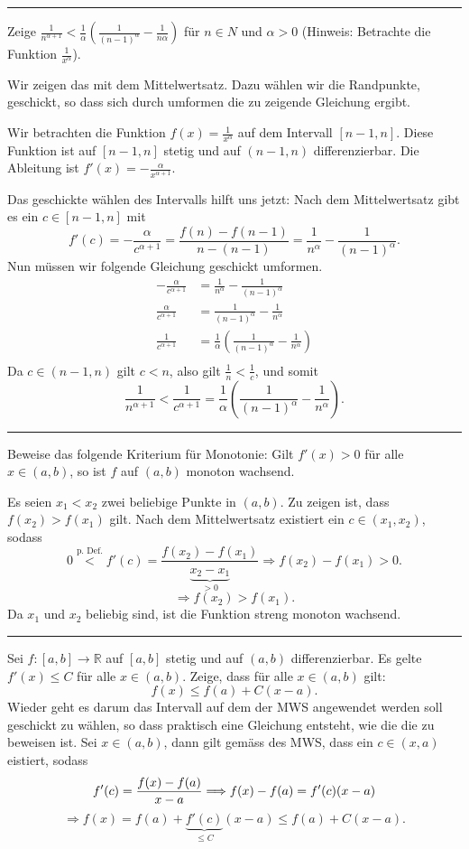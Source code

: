 \documentclass[a4paper,landscape,8pt]{extarticle}
\newcommand{\R}{\mathbb{R}}
\newcommand{\sep}{\vspace{5pt}\noindent\hrule\vspace{5pt}}
\begin{document}
\begin{multicols*}{4}
\begin{warmup}
\sep

\Bsp Zeige $\frac{1}{n^{\alpha+1}} <
\frac{1}{\alpha}\left(\frac{1}{(n-1)^\alpha} - \frac{1}{n\alpha}\right)$ für
$n\in N$ und $\alpha > 0$ (Hinweis: Betrachte die Funktion
$\frac{1}{x^\alpha}$).

Wir zeigen das mit dem Mittelwertsatz. Dazu wählen wir die Randpunkte,
geschickt, so dass sich durch umformen die zu zeigende Gleichung ergibt.

Wir betrachten die Funktion $f(x)=\frac{1}{x^\alpha}$ auf dem Intervall
$[n-1,n]$. Diese Funktion ist auf $[n-1,n]$ stetig und auf $(n-1,n)$
differenzierbar. Die Ableitung ist $f'(x)=-\frac{\alpha}{x^{\alpha +1}}$.

Das geschickte wählen des Intervalls hilft uns jetzt: Nach dem Mittelwertsatz
gibt es ein $c\in[n-1,n]$ mit
\[
f'(c) = -\frac{\alpha}{c^{\alpha +1}} = \frac{f(n)-f(n-1)}{n-(n-1)} =
\frac{1}{n^\alpha}-\frac{1}{(n-1)^\alpha}.
\]
Nun müssen wir folgende Gleichung geschickt umformen.
\begin{align*}
-\frac{\alpha}{c^{\alpha +1}} &= \frac{1}{n^\alpha}-\frac{1}{(n-1)^\alpha}
\\
\frac{\alpha}{c^{\alpha +1}} &= \frac{1}{(n-1)^\alpha}-\frac{1}{n^\alpha}
\\
\frac{1}{c^{\alpha +1}} &=
\frac{1}{\alpha}\left(\frac{1}{(n-1)^\alpha}-\frac{1}{n^\alpha}\right)\\
\end{align*}
Da $c\in(n-1,n)$ gilt $c<n$, also gilt $\frac{1}{n}<\frac{1}{c}$, und
somit
\[\frac{1}{n^{\alpha +1}}<
\frac{1}{c^{\alpha +1}} =
\frac{1}{\alpha}\left(\frac{1}{(n-1)^\alpha}-\frac{1}{n^\alpha}\right).
\]

\sep

\Bsp Beweise das folgende Kriterium für Monotonie: Gilt $f'(x)>0$ für alle
$x\in(a,b)$, so ist $f$ auf $(a,b)$ monoton wachsend.

Es seien $x_1<x_2$ zwei beliebige Punkte in $(a,b)$. Zu zeigen ist, dass
$f(x_2) > f(x_1)$ gilt. Nach dem Mittelwertsatz existiert ein $c\in(x_1,x_2)$,
sodass
\[
0 \stackrel{\text{p. Def.}}{<} f'(c) =
\frac{f(x_2)-f(x_1)}{\underbrace{x_2-x_1}_{>0}}
\Longrightarrow
f(x_2) - f(x_1) > 0.
\]
\[
\Longrightarrow f(x_2) > f(x_1).
\]
Da $x_1$ und $x_2$ beliebig sind, ist die Funktion streng monoton wachsend.

\sep

\Bsp Sei $f\colon[a,b]\to\R$ auf $[a,b]$ stetig und auf $(a,b)$ differenzierbar.
Es gelte $f'(x)\leq C$ für alle $x\in(a,b)$. Zeige, dass für alle $x\in(a,b)$
gilt:
\[
f(x)\leq f(a) +C(x-a).
\]
Wieder geht es darum das Intervall auf dem der MWS angewendet werden soll
geschickt zu wählen, so dass praktisch eine Gleichung entsteht, wie die die zu
beweisen ist. Sei $x\in(a,b)$, dann gilt gemäss des MWS, dass ein $c\in(x,a)$
eistiert, sodass
\[
f'(c) = \frac{f(x)-f(a)}{x-a} \Longrightarrow f(x) -
f(a) = f'(c)(x-a)\\
\]
\[
\Longrightarrow
f(x) =f(a) + \underbrace{f'(c)}_{\leq C}(x-a) \leq f(a) + C(x-a).
\]


\end{warmup}
\end{multicols*}
\end{document}
